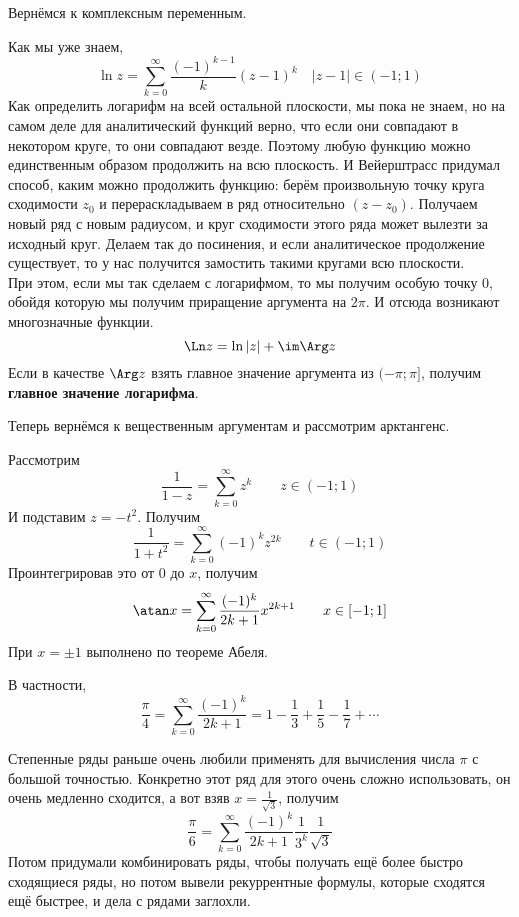 \documentclass{article}
\begin{document}
    \begin{remark}
        Вернёмся к комплексным переменным.
    \end{remark}
    \begin{definition}
        Как мы уже знаем,
        $$
        \ln z=\sum\limits_{k=0}^\infty\frac{(-1)^{k-1}}k(z-1)^k\quad |z-1|\in(-1;1)
        $$
        Как определить логарифм на всей остальной плоскости, мы пока не знаем, но на самом деле для аналитический функций верно, что если они совпадают в некотором круге, то они совпадают везде. Поэтому любую функцию можно единственным образом продолжить на всю плоскость. И Вейерштрасс придумал способ, каким можно продолжить функцию: берём произвольную точку круга сходимости $z_0$ и перераскладываем в ряд относительно $(z-z_0)$. Получаем новый ряд с новым радиусом, и круг сходимости этого ряда может вылезти за исходный круг. Делаем так до посинения, и если аналитическое продолжение существует, то у нас получится замостить такими кругами всю плоскости.\\
        При этом, если мы так сделаем с логарифмом, то мы получим особую точку 0, обойдя которую мы получим приращение аргумента на $2\pi$. И отсюда возникают многозначные функции.
        $$
        \Ln z=\ln |z|+\im\Arg z
        $$
        Если в качестве $\Arg z$ взять главное значение аргумента из $(-\pi;\pi]$, получим \textbf{главное значение логарифма}.
    \end{definition}
    \begin{remark}
        Теперь вернёмся к вещественным аргументам и рассмотрим арктангенс.
    \end{remark}
    \begin{claim}
        Рассмотрим
        $$
        \frac1{1-z}=\sum\limits_{k=0}^\infty z^k\qquad z\in(-1;1)
        $$
        И подставим $z=-t^2$. Получим
        $$
        \frac1{1+t^2}=\sum\limits_{k=0}^\infty(-1)^kz^{2k}\qquad t\in(-1;1)
        $$
        Проинтегрировав это от 0 до $x$, получим
        $$
        \atan x=\sum\limits_{k=0}^\infty\frac{(-1)^k}{2k+1}x^{2k+1}\qquad x\in[-1;1]
        $$
        При $x=\pm1$ выполнено по теореме Абеля.
    \end{claim}
    \begin{claim}
        В частности,
        $$
        \frac\pi4=\sum\limits_{k=0}^\infty\frac{(-1)^k}{2k+1}=1-\frac13+\frac15-\frac17+\cdots
        $$
    \end{claim}
    \begin{remark}
        Степенные ряды раньше очень любили применять для вычисления числа $\pi$ с большой точностью. Конкретно этот ряд для этого очень сложно использовать, он очень медленно сходится, а вот взяв $x=\frac1{\sqrt3}$, получим
        $$
        \frac\pi6=\sum\limits_{k=0}^\infty\frac{(-1)^k}{2k+1}\frac1{3^k}\frac1{\sqrt3}
        $$
        Потом придумали комбинировать ряды, чтобы получать ещё более быстро сходящиеся ряды, но потом вывели рекуррентные формулы, которые сходятся ещё быстрее, и дела с рядами заглохли.
    \end{remark}
\end{document}
